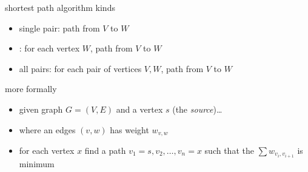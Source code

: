 \begin{frame}{shortest path algorithm kinds}
\begin{itemize}
\item single pair: path from $V$ to $W$
\item {}: for each vertex $W$, path from $V$ to $W$
\item all pairs: for each pair of vertices $V, W$, path from $V$ to $W$
\end{itemize}
\end{frame}

\begin{frame}{more formally}
\begin{itemize}
\item given graph $G = (V,E)$ and a vertex $s$ (the \textit{source})\ldots
\item where an edges $(v, w)$ has weight $w_{v,w}$
\item for each vertex $x$ find a path $v_1=s, v_2, \ldots, v_n=x$ such that the $\sum w_{v_i,v_{i+1}}$ is minimum
\end{itemize}
\end{frame}
